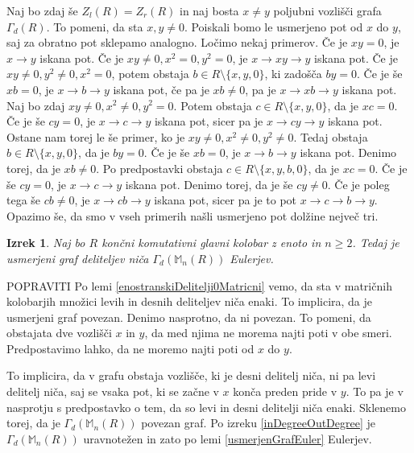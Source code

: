 \documentclass[a4paper, 12pt]{amsart}
\theoremstyle{definition} %
\theoremstyle{plain} %
\newtheorem{izrek}[definicija]{Izrek}
\newcommand{\M}{\mathbb M}
\begin{document}
Naj bo zdaj še $Z_l(R) = Z_r(R)$ in naj bosta $x\neq y$ poljubni vozlišči grafa $\Gamma_d(R)$. To pomeni, da sta $x,y\neq 0$. Poiskali bomo le usmerjeno pot od $x$ do $y$, saj za obratno pot sklepamo analogno. Ločimo nekaj primerov. Če je $xy=0$, je $x\rightarrow y$ iskana pot. Če je $xy \neq 0, x^2 = 0, y^2 =0$, je $x\rightarrow xy \rightarrow y$ iskana pot. Če je $xy\neq 0, y^2 \neq 0, x^2 = 0$, potem obstaja $b\in R\setminus\{x,y,0\}$, ki zadošča $by = 0$. Če je še $xb =0$, je $x\rightarrow b \rightarrow y$ iskana pot, če pa je $xb \neq 0$, pa je $x\rightarrow xb  \rightarrow y$ iskana pot. Naj bo zdaj $xy\neq0, x^2\neq 0, y^2 =0$. Potem obstaja $c\in R\setminus \{x,y,0\}$, da je $xc = 0$. Če je še $cy = 0$, je $x\rightarrow c \rightarrow y$ iskana pot, sicer pa je $x \rightarrow cy \rightarrow y$ iskana pot. Ostane nam torej le še primer, ko je $xy\neq 0, x^2 \neq 0, y^2 \neq 0$. Tedaj obstaja $b\in R\setminus \{x,y,0\}$, da je $by=0$. Če je še $xb=0$, je $x\rightarrow b \rightarrow y$ iskana pot. Denimo torej, da je $xb\neq 0$. Po predpostavki obstaja $c\in R\setminus \{x,y,b,0\}$, da je $xc=0$. Če je še $cy = 0$, je $x\rightarrow c \rightarrow y$ iskana pot. Denimo torej, da je še $cy\neq 0$. Če je poleg tega še $cb \neq 0$, je $x\rightarrow cb \rightarrow y$ iskana pot, sicer pa je to pot $x\rightarrow c \rightarrow b \rightarrow y$.
Opazimo še, da smo v vseh primerih našli usmerjeno pot dolžine nejveč tri.
\endproof

\begin{izrek}
Naj bo $R$ končni komutativni glavni kolobar z enoto in $n\ge 2$. Tedaj je usmerjeni graf deliteljev niča $\Gamma_d(\M_n(R))$ Eulerjev.
\end{izrek}

\proof
POPRAVITI
Po lemi \ref{enostranskiDelitelji0Matricni} vemo, da sta v matričnih kolobarjih množici levih  in desnih deliteljev niča enaki. To implicira, da je usmerjeni graf povezan. Denimo nasprotno, da ni povezan. To pomeni, da obstajata dve vozlišči $x$ in $y$, da med njima ne morema najti poti v obe smeri. Predpostavimo lahko, da ne moremo najti poti od $x$ do $y$. 


To implicira, da v grafu obstaja vozlišče, ki je desni delitelj niča, ni pa levi delitelj niča, saj se vsaka pot, ki se začne v $x$ konča preden pride v $y$. To pa je v nasprotju s predpostavko o tem, da so levi in desni delitelji niča enaki. Sklenemo torej, da je $\Gamma_d(\M_n(R))$ povezan graf. Po izreku \ref{inDegreeOutDegree} je $\Gamma_d(\M_n(R))$ uravnotežen in zato po lemi \ref{usmerjenGrafEuler} Eulerjev.
\endproof
\end{document}
